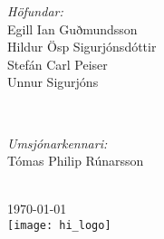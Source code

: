 \documentclass[12pt]{article}
\begin{document}
\begin{titlepage}
        \begin{minipage}{0.4\textwidth}
            \begin{flushleft} \large
                \emph{Höfundar:}\\
                Egill Ian Guðmundsson\\
                Hildur Ösp Sigurjónsdóttir\\
                Stefán Carl Peiser\\ %
				Unnur Sigurjóns
            \end{flushleft}
        \end{minipage}
        ~
        \begin{minipage}{0.4\textwidth}
            \begin{flushright} \large
                \emph{Umsjónarkennari:} \\
                Tómas Philip Rúnarsson\\
            \end{flushright}
        \end{minipage}\\[4cm]
        
        
        
        {\large \today}\\[3cm] %
        
        
       \texttt{[image: hi\_logo]}\\[1cm] %
        
        
        \vfill %
        
    \end{titlepage}
\end{document}
